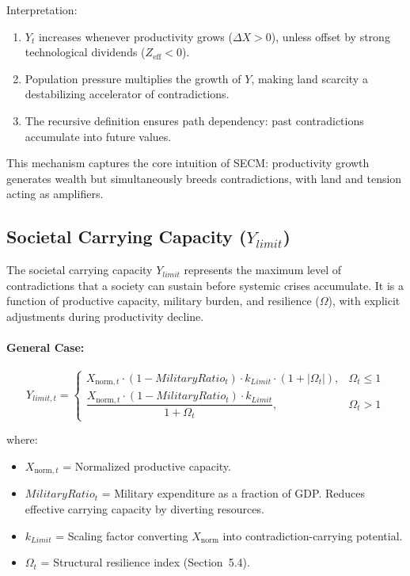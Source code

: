 \documentclass[12pt,a4paper]{article}
\begin{document}
\noindent Interpretation:
\begin{enumerate}
    \item $Y_t$ increases whenever productivity grows ($\Delta X > 0$), 
          unless offset by strong technological dividends ($Z_{\mathrm{eff}} < 0$).
    \item Population pressure multiplies the growth of $Y$, making land scarcity 
          a destabilizing accelerator of contradictions.
    \item The recursive definition ensures path dependency: past contradictions 
          accumulate into future values.
\end{enumerate}

\noindent This mechanism captures the core intuition of SECM: productivity growth 
generates wealth but simultaneously breeds contradictions, with land and tension 
acting as amplifiers.
\subsection{Societal Carrying Capacity (\texorpdfstring{$Y_{limit}$}{Ylimit})}

The societal carrying capacity $Y_{limit}$ represents the maximum level of 
contradictions that a society can sustain before systemic crises accumulate. 
It is a function of productive capacity, military burden, and resilience 
($\Omega$), with explicit adjustments during productivity decline. 

\paragraph{General Case:}
\begin{equation}
Y_{limit,t} =
\begin{cases}
X_{\mathrm{norm},t} \cdot (1 - MilitaryRatio_t) \cdot k_{Limit} \cdot (1 + |\Omega_t|), & \Omega_t \leq 1 \\
\dfrac{X_{\mathrm{norm},t} \cdot (1 - MilitaryRatio_t) \cdot k_{Limit}}{1 + \Omega_t}, & \Omega_t > 1
\end{cases}
\end{equation}

\noindent where:
\begin{itemize}
    \item $X_{\mathrm{norm},t}$ = Normalized productive capacity.
    \item $MilitaryRatio_t$ = Military expenditure as a fraction of GDP. 
          Reduces effective carrying capacity by diverting resources.
    \item $k_{Limit}$ = Scaling factor converting $X_{\mathrm{norm}}$ into 
          contradiction-carrying potential.
    \item $\Omega_t$ = Structural resilience index (Section~5.4).
\end{itemize}
\end{document}
